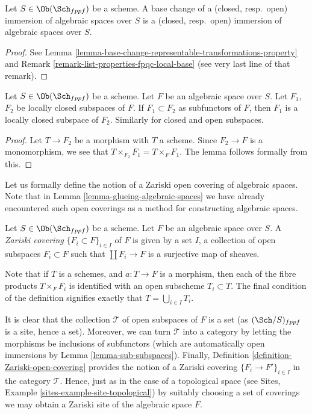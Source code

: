 \begin{lemma}
\label{lemma-base-change-immersions}
Let $S \in \Ob(\Sch_{fppf})$ be a scheme.
A base change of a (closed, resp.\ open) immersion
of algebraic spaces over $S$ is a (closed, resp.\ open)
immersion of algebraic spaces over $S$.
\end{lemma}

\begin{proof}
See Lemma \ref{lemma-base-change-representable-transformations-property} and
Remark \ref{remark-list-properties-fpqc-local-base} (see very last line of
that remark).
\end{proof}

\begin{lemma}
\label{lemma-sub-subspaces}
Let $S \in \Ob(\Sch_{fppf})$ be a scheme.
Let $F$ be an algebraic space over $S$. Let $F_1$, $F_2$ be
locally closed subspaces of $F$. If $F_1 \subset F_2$ as subfunctors
of $F$, then $F_1$ is a locally closed subspace of $F_2$.
Similarly for closed and open subspaces.
\end{lemma}

\begin{proof}
Let $T \to F_2$ be a morphism with $T$ a scheme.
Since $F_2 \to F$ is a monomorphism, we see that
$T \times_{F_2} F_1 = T \times_F F_1$. The lemma follows
formally from this.
\end{proof}

\noindent
Let us formally define the notion of a Zariski open covering of
algebraic spaces. Note that in Lemma \ref{lemma-glueing-algebraic-spaces}
we have already encountered such open coverings as a method for
constructing algebraic spaces.

\begin{definition}
\label{definition-Zariski-open-covering}
Let $S \in \Ob(\Sch_{fppf})$ be a scheme.
Let $F$ be an algebraic space over $S$.
A {\it Zariski covering} $\{F_i \subset F\}_{i \in I}$ of $F$
is given by a set $I$, a collection of open subspaces
$F_i \subset F$ such that $\coprod F_i \to F$ is a surjective
map of sheaves.
\end{definition}

\noindent
Note that if $T$ is a schemes,
and $a : T \to F$ is a morphism, then each of the fibre products
$T \times_F F_i$ is identified with an open subscheme
$T_i \subset T$. The final condition of the definition signifies
exactly that $T = \bigcup_{i \in I} T_i$.

\medskip\noindent
It is clear that the collection $\mathcal{T}$ of open subspaces of
$F$ is a set (as $(\Sch/S)_{fppf}$ is a site, hence a set).
Moreover, we can turn $\mathcal{T}$ into a category by letting the
morphisms be inclusions of subfunctors (which are automatically open
immersions by Lemma \ref{lemma-sub-subspaces}). Finally,
Definition \ref{definition-Zariski-open-covering}
provides the notion of a Zariski covering $\{F_i \to F'\}_{i \in I}$
in the category $\mathcal{T}$. Hence, just as in the case of a topological
space (see Sites, Example \ref{sites-example-site-topological})
by suitably choosing a set of coverings
we may obtain a Zariski site of the algebraic space $F$.

